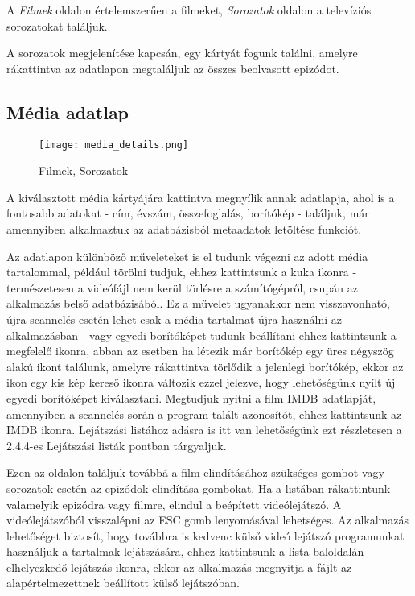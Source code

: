 A {\it Filmek} oldalon értelemszerűen a filmeket, {\it Sorozatok} oldalon a televíziós sorozatokat találjuk.

A sorozatok megjelenítése kapcsán, egy kártyát fogunk találni, amelyre rákattintva az adatlapon megtaláljuk az összes beolvasott epizódot.

\subsection{Média adatlap}
\begin{figure}[H]
	\centering
	\texttt{[image: media\_details.png]}
	\caption{Filmek, Sorozatok}
	\label{fig:media_details}
\end{figure}
A kiválasztott média kártyájára kattintva megnyílik annak adatlapja, ahol is a fontosabb adatokat - cím, évszám, összefoglalás, borítókép - találjuk, már amennyiben alkalmaztuk az adatbázisból metaadatok letöltése funkciót.

Az adatlapon különböző műveleteket is el tudunk végezni az adott média tartalommal, például törölni tudjuk, ehhez kattintsunk a kuka ikonra - természetesen a videófájl nem kerül törlésre a számítógépről, csupán az alkalmazás belső adatbázisából. Ez a művelet ugyanakkor nem visszavonható, újra scannelés esetén lehet csak a média tartalmat újra használni az alkalmazásban - vagy egyedi borítóképet tudunk beállítani ehhez kattintsunk a megfelelő ikonra, abban az esetben ha létezik már borítókép egy üres négyszög alakú ikont találunk, amelyre rákattintva törlődik a jelenlegi borítókép, ekkor az ikon egy kis kép kereső ikonra változik ezzel jelezve, hogy lehetőségünk nyílt új egyedi borítóképet kiválasztani. Megtudjuk nyitni a film IMDB adatlapját, amennyiben a scannelés során a program talált azonosítót, ehhez kattintsunk az IMDB ikonra. Lejátszási listához adásra is itt van lehetőségünk ezt részletesen a 2.4.4-es Lejátszási listák pontban tárgyaljuk.

Ezen az oldalon találjuk továbbá a film elindításához szükséges gombot vagy sorozatok esetén az epizódok elindítása gombokat. Ha a listában rákattintunk valamelyik epizódra vagy filmre, elindul a beépített videólejátszó. A videólejátszóból visszalépni az ESC gomb lenyomásával lehetséges. Az alkalmazás lehetőséget biztosít, hogy továbbra is kedvenc külső videó lejátszó programunkat használjuk a tartalmak lejátszására, ehhez kattintsunk a lista baloldalán elhelyezkedő lejátszás ikonra, ekkor az alkalmazás megnyitja a fájlt az alapértelmezettnek beállított külső lejátszóban.

